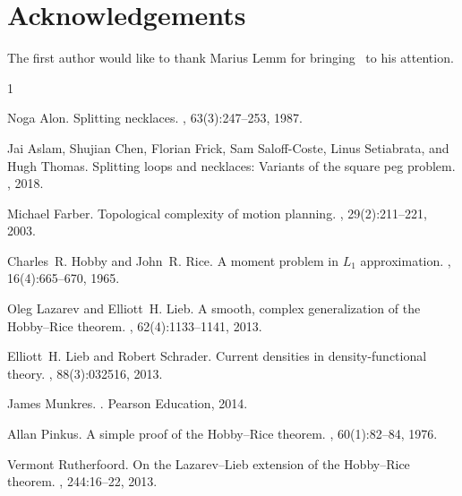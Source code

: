\documentclass[11pt, reqno, english]{amsart}
\theoremstyle{plain}
\theoremstyle{definition}
\begin{document}
\section*{Acknowledgements}

The first author would like to thank Marius Lemm for bringing~\cite{lazarev2013}
to his attention.





\begin{thebibliography}{1}

Noga Alon.
\newblock Splitting necklaces.
, 63(3):247--253, 1987.

Jai Aslam, Shujian Chen, Florian Frick, Sam Saloff-Coste, Linus Setiabrata, and
  Hugh Thomas.
\newblock Splitting loops and necklaces: Variants of the square peg problem.
, 2018.

Michael Farber.
\newblock Topological complexity of motion planning.
, 29(2):211--221, 2003.

Charles~R. Hobby and John~R. Rice.
\newblock A moment problem in {$L_1$} approximation.
, 16(4):665--670, 1965.

Oleg Lazarev and Elliott~H. Lieb.
\newblock A smooth, complex generalization of the {H}obby--{R}ice theorem.
, 62(4):1133--1141, 2013.

Elliott~H. Lieb and Robert Schrader.
\newblock Current densities in density-functional theory.
, 88(3):032516, 2013.

James Munkres.
.
\newblock Pearson Education, 2014.

Allan Pinkus.
\newblock A simple proof of the {H}obby--{R}ice theorem.
, 60(1):82--84, 1976.

Vermont Rutherfoord.
\newblock On the {L}azarev--{L}ieb extension of the {H}obby--{R}ice theorem.
, 244:16--22, 2013.

\end{thebibliography}
\end{document}
